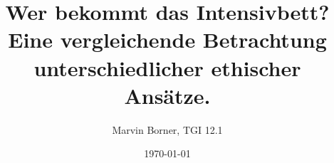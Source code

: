 \documentclass[a4paper]{article}
\begin{document}
\title{Wer bekommt das Intensivbett?\\Eine vergleichende Betrachtung unterschiedlicher ethischer Ansätze.}
\author{Marvin Borner, TGI 12.1}
\date{\today}

%
%
%

\maketitle



\end{document}
